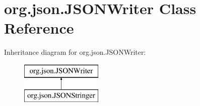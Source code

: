 \hypertarget{classorg_1_1json_1_1_j_s_o_n_writer}{\section{org.\-json.\-J\-S\-O\-N\-Writer Class Reference}
\label{classorg_1_1json_1_1_j_s_o_n_writer}
}
Inheritance diagram for org.\-json.\-J\-S\-O\-N\-Writer\-:\begin{figure}[H]
\begin{center}
\leavevmode
\includegraphics[height=2.000000cm]{classorg_1_1json_1_1_j_s_o_n_writer}
\end{center}
\end{figure}
